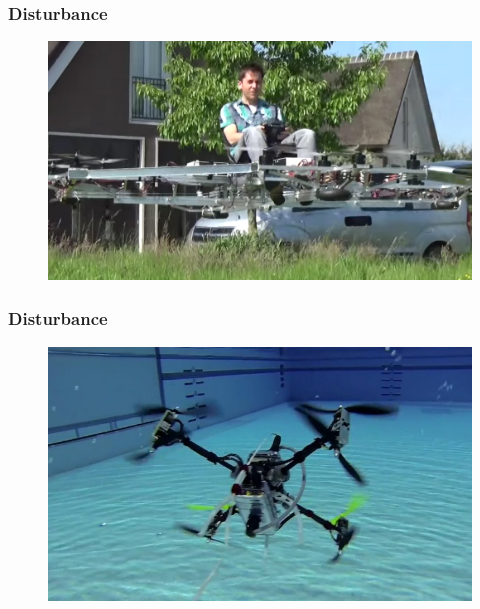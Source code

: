 \begin{frame}
\frametitle{Disturbance}

  \begin{figure}
  \includegraphics[scale=0.19]{pic/03_our-copter/human_quad.png}
  \end{figure}
    
\end{frame}



\begin{frame}
\frametitle{Disturbance}

  \begin{figure}
  \includegraphics[scale=0.45]{pic/03_our-copter/underwater.jpg}
  \end{figure}
    
\end{frame}
